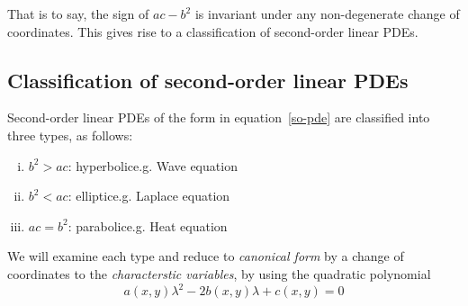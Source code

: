 \documentclass[10pt,fleqn]{article}
\theoremstyle{definition} \newtheorem{defn}{Definition}[section]
\theoremstyle{plain}      \newtheorem{thm}[defn]{Theorem}
\theoremstyle{plain}      \newtheorem{lem}[defn]{Lemma}
\theoremstyle{definition} \newtheorem{prop}[defn]{Proposition}
\theoremstyle{definition} \newtheorem{cor}[defn]{Corollary}
\theoremstyle{definition} \newtheorem{ex}[defn]{Example}
\theoremstyle{definition} \newtheorem{rem}[defn]{Remark}
\begin{document}
That is to say, the sign of $ac-b^2$ is invariant under any non-degenerate change of coordinates.
This gives rise to a classification of second-order linear PDEs.


\subsection{Classification of second-order linear PDEs}

Second-order linear PDEs of the form in equation~\ref{so-pde} are classified into three types, as follows:
\begin{enumerate}[(i)]
    \item $b^2>ac$: hyperbolic\qquad e.g. Wave equation
    \item $b^2<ac$: elliptic\qquad e.g. Laplace equation
    \item $ac=b^2$: parabolic\qquad e.g. Heat equation
\end{enumerate}

We will examine each type and reduce to \emph{canonical form} by a change of coordinates to the \emph{characterstic variables}, by using the quadratic polynomial
\begin{equation}\label{pde-quadratic}
    a(x,y)\lambda^2-2b(x,y)\lambda+c(x,y)=0
\end{equation}
\end{document}
